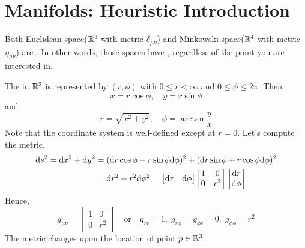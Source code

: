 \documentclass[a4paper, 10pt]{article}
\begin{document}
\setcounter{section}{2}
\setcounter{subsection}{0}
\setcounter{theorem}{0}

\section{Manifolds: Heuristic Introduction}

\begin{remark}
    Both Euclidean space($\mathbb{R}^{3}$ with metric $\delta_{\mu\nu}$) and Minkowski space($\mathbb{R}^{4}$ with metric $\eta_{\mu\nu}$) are . In other words, those spaces have , regardless of the point you are interested in.
\end{remark}

\begin{definition}
    The  in $\mathbb{R}^{2}$ is represented by $(r,\phi)$ with $0\leq r < \infty$ and $0 \leq \phi \leq 2\pi$. Then
    \[ x = r\cos\phi, \quad y = r\sin\phi \]
    and
    \[ r = \sqrt{x^{2} + y^{2}}, \quad \phi = \arctan\frac{y}{x} \]
    Note that the coordinate system is well-defined except at $r = 0$. Let's compute the metric.
    \begin{align*}
        \mathrm{d} s^{2} = \mathrm{d} x^{2} + \mathrm{d} y^{2} &= (\mathrm{d} r\cos\phi - r\sin\phi\mathrm{d} \phi)^{2} + (\mathrm{d} r\sin\phi + r\cos\phi\mathrm{d}{\phi})^{2} \\
        &= \mathrm{d}{r}^{2} + r^{2}\mathrm{d}\phi^{2} = \begin{bmatrix}\mathrm{d}{r} & \mathrm{d}\phi\end{bmatrix}\begin{bmatrix}1 & 0 \\ 0 & r^{2}\end{bmatrix}\begin{bmatrix}\mathrm{d}{r} \\ \mathrm{d}\phi\end{bmatrix}
    \end{align*}
    Hence,
    \[ g_{\mu\nu} = \begin{bmatrix}1 & 0 \\ 0 & r^{2}\end{bmatrix} \quad\text{or}\quad g_{rr} = 1,\; g_{r\phi} = g_{\phi r} = 0,\; g_{\phi\phi} = r^{2} \]
    The metric changes upon the location of point $p \in \mathbb{R}^{3}$.
\end{definition}
\end{document}
